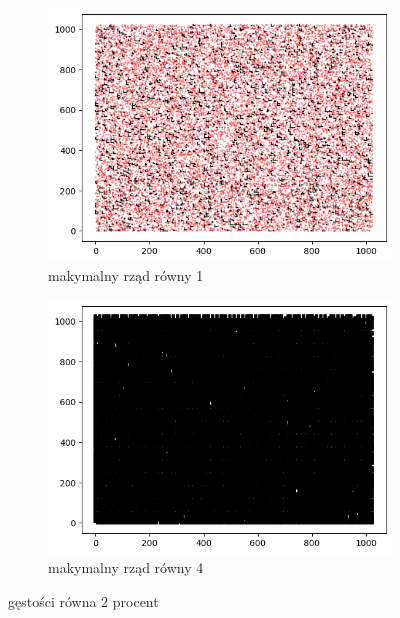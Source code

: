 \documentclass{article}
\begin{document}
\begin{figure}[htbp]
  \centering
  \begin{subfigure}[b]{0.4\textwidth}
      \includegraphics[width=\linewidth]{img/2proc.png}
      \caption{makymalny rząd równy 1}
      \label{fig:obraz1}
  \end{subfigure}
  \hfill
  \begin{subfigure}[b]{0.4\textwidth}
      \includegraphics[width=\linewidth]{img/2proc4.png}
      \caption{makymalny rząd równy 4}
      \label{fig:obraz2}
  \end{subfigure}
  \caption{gęstości równa 2 procent}
  \label{fig:zestaw_obrazkow}
\end{figure}
\end{document}
